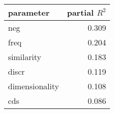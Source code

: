 \begin{tabular}{lr}
\toprule
      parameter &  partial $R^2$ \\
\midrule
            neg &  0.309 \\
           freq &  0.204 \\
     similarity &  0.183 \\
          discr &  0.119 \\
 dimensionality &  0.108 \\
            cds &  0.086 \\
\bottomrule
\end{tabular}
